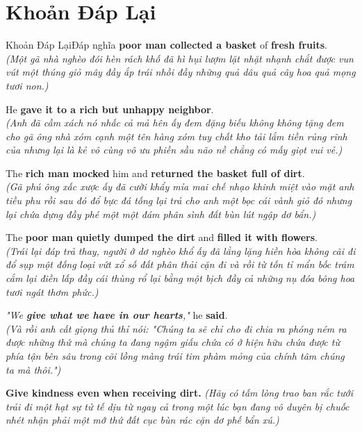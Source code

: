 \section{Khoản Đáp Lại}
\begin{truyen}{Khoản Đáp Lại}{Đáp nghĩa}
 \textbf{poor man collected a basket} of \textbf{fresh fruits}.\\
\textit{(Một gã nhà nghèo đói hèn rách khố đã hì hụi lượm lặt nhặt nhạnh chắt được vun vút một thúng giỏ mây đầy ắp trái nhồi đầy những quả dâu quả cây hoa quả mọng tươi non.)}

He \textbf{gave it to a rich but unhappy neighbor}.\\
\textit{(Anh đã cầm xách nó nhấc cả mả hên ấy đem đặng biếu không không tặng đem cho gã ông nhà xóm cạnh một tên hàng xóm tuy chất kho tải lắm tiền rủng rĩnh của nhưng lại là kẻ vô cùng vô ưu phiền sầu não nề chẳng có mấy giọt vui vẻ.)}

The \textbf{rich man mocked} him and \textbf{returned the basket full of dirt}.\\
\textit{(Gã phú ông xấc xược ấy đã cười khẩy mỉa mai chế nhạo khinh miệt vào mặt anh tiều phu rồi sau đó đổ bực đá tống lại trả cho anh một bọc cái vành giỏ đó nhưng lại chứa dựng đầy phé một một đám phân sình đất bùn lút ngập dơ bẩn.)}

The \textbf{poor man quietly dumped the dirt} and \textbf{filled it with flowers}.\\
\textit{(Trái lại đáp trả thay, người ở dơ nghèo khổ ấy đã lẳng lặng hiền hòa không cãi đi đổ sụp một đống loại vứt xổ số đất phân thải cặn đi và rồi từ tốn tỉ mẩn bốc trám cắm lại điền lấp đầy cái thùng rổ lại bằng một bịch đầy cả những nụ đóa bông hoa tươi ngát thơm phức.)}

\textit{"We \textbf{give what we have in our hearts},"} he \textbf{said}.\\
\textit{(Và rồi anh cất giọng thủ thỉ nói: "Chúng ta sẽ chỉ cho đi chia ra phóng ném ra được những thứ mà chúng ta đang ngậm giấu chứa có ở hiện hữu chứa được từ phía tận bên sâu trong cõi lồng màng trái tim phàm mỏng của chính tâm chúng ta mà thôi.")}
\end{truyen}

\begin{baihoc}
  \textbf{Give kindness even when receiving dirt.} \textit{(Hãy có tấm lòng trao ban rắc tưới trải đi một hạt sự tử tế dịu từ ngay cả trong một lúc bạn đang vô duyên bị chuốc nhét nhận phải một mớ thứ đất cục bùn rác cặn dơ phế bẩn xú.)}
\end{baihoc}


